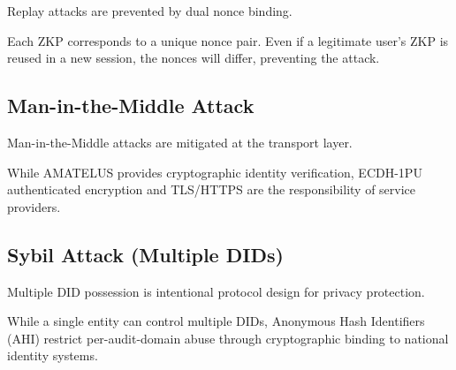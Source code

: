 \begin{theorem}
  \label{thm:replay-resistance}
  Replay attacks are prevented by dual nonce binding.

  Each ZKP corresponds to a unique nonce pair. Even if a legitimate user's ZKP is
  reused in a new session, the nonces will differ, preventing the attack.
  \leanok
\end{theorem}

\subsection{Man-in-the-Middle Attack}

\begin{proposition}
  \label{prop:mitm-defense}
  Man-in-the-Middle attacks are mitigated at the transport layer.

  While AMATELUS provides cryptographic identity verification, ECDH-1PU authenticated
  encryption and TLS/HTTPS are the responsibility of service providers.
\end{proposition}

\subsection{Sybil Attack (Multiple DIDs)}

\begin{proposition}
  \label{prop:sybil-resilience}
  Multiple DID possession is intentional protocol design for privacy protection.

  While a single entity can control multiple DIDs, Anonymous Hash Identifiers (AHI)
  restrict per-audit-domain abuse through cryptographic binding to national identity systems.
\end{proposition}

